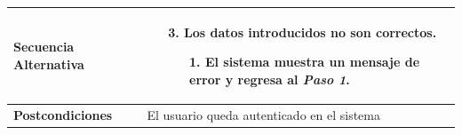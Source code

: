 \begin{longtable}{| p{4cm} | p{10cm} |}
\hline
\textbf{Secuencia Alternativa} &\mbox{}\par\vspace{-\baselineskip}
\begin{enumerate}[leftmargin=0.9cm, topsep=0.1cm]
\item[3.] Los datos introducidos no son correctos.
	\begin{itemize}
	\item[1.] El sistema muestra un mensaje de error y regresa al \textit{Paso 1}.
	\end{itemize}

\end{enumerate}\\

\hline
\textbf{Postcondiciones} & 
El usuario queda autenticado en el sistema\\
\hline
\end{longtable}




\newpage
